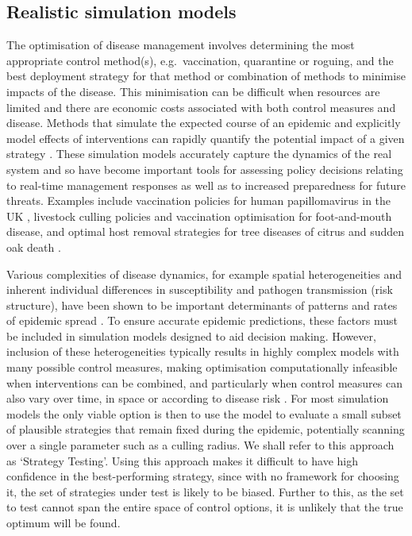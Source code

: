 \subsection*{Realistic simulation models}
\label{sec:LandscapeScale}

The optimisation of disease management involves determining the most appropriate control method(s), e.g.\ vaccination, quarantine or roguing, and the best deployment strategy for that method or combination of methods to minimise impacts of the disease. This minimisation can be difficult when resources are limited and there are economic costs associated with both control measures and disease. Methods that simulate the expected course of an epidemic and explicitly model effects of interventions can rapidly quantify the potential impact of a given strategy \citep{lofgren_opinion_2014}. These simulation models accurately capture the dynamics of the real system and so have become important tools for assessing policy decisions relating to real-time management responses as well as to increased preparedness for future threats. Examples include vaccination policies for human papillomavirus in the UK \citep{jit_economic_2008, choi_transmission_2010}, livestock culling policies \citep{keeling_dynamics_2001, keeling_models_2005} and vaccination optimisation \citep{keeling_modelling_2003, tildesley_optimal_2006} for foot-and-mouth disease, and optimal host removal strategies for tree diseases of citrus \citep{cunniffe_optimising_2015, hyatt-twynam_risk-based_2017, adrakey_evidence-based_2017, craig_grower_2018} and sudden oak death \citep{cunniffe_modelling_2016}.

Various complexities of disease dynamics, for example spatial heterogeneities and inherent individual differences in susceptibility and pathogen transmission (risk structure), have been shown to be important determinants of patterns and rates of epidemic spread \citep{keeling_modeling_2007, anderson_preliminary_1986, smith_predicting_2002}. To ensure accurate epidemic predictions, these factors must be included in simulation models designed to aid decision making. However, inclusion of these heterogeneities typically results in highly complex models with many possible control measures, making optimisation computationally infeasible when interventions can be combined, and particularly when control measures can also vary over time, in space or according to disease risk \citep{bellman_dynamic_2013}. For most simulation models the only viable option is then to use the model to evaluate a small subset of plausible strategies that remain fixed during the epidemic, potentially scanning over a single parameter such as a culling radius. We shall refer to this approach as `Strategy Testing'. Using this approach makes it difficult to have high confidence in the best-performing strategy, since with no framework for choosing it, the set of strategies under test is likely to be biased. Further to this, as the set to test cannot span the entire space of control options, it is unlikely that the true optimum will be found.

